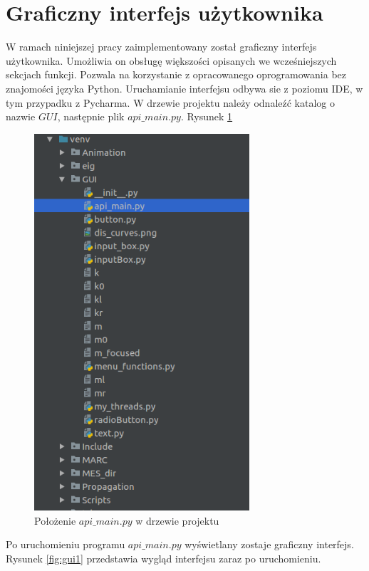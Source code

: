 \section{Graficzny interfejs użytkownika}

W ramach niniejszej pracy zaimplementowany został graficzny interfejs użytkownika. Umożliwia on obsługę większości opisanych we wcześniejszych sekcjach funkcji. Pozwala na korzystanie z opracowanego oprogramowania bez znajomości języka Python. Uruchamianie interfejsu odbywa sie z poziomu IDE, w tym przypadku z Pycharma. W drzewie projektu należy odnaleźć katalog o nazwie $GUI$, następnie plik $api\_main.py$. Rysunek \ref{fig:gui_tu_jest}

\begin{figure}[h]
\centering
\includegraphics[width=8cm]{Zdjecia/5/kasia/gui_drzewo}
\caption{Położenie $api\_main.py$ w drzewie projektu}
\label{fig:gui_tu_jest}
\end{figure}

Po uruchomieniu programu $api\_main.py$ wyświetlany zostaje graficzny interfejs. Rysunek \ref{fig:gui1} przedstawia wygląd interfejsu zaraz po uruchomieniu.

